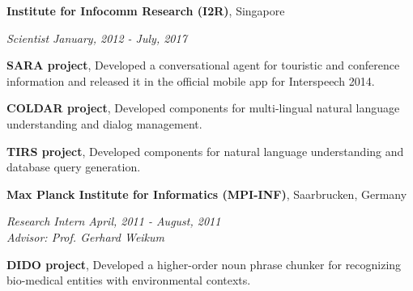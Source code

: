 \documentclass[margin,line]{res}
\newenvironment{list1}{
  \begin{list}{\ding{113}}{%
      \setlength{\itemsep}{0in}
      \setlength{\parsep}{0in} \setlength{\parskip}{0in}
      \setlength{\topsep}{0in} \setlength{\partopsep}{0in}
      \setlength{\leftmargin}{0.17in}}}{\end{list}}
\begin{document}
\begin{resume}
{\bf Institute for Infocomm Research (I2R)}, Singapore\\
\vspace{-.3cm}
\begin{list1}
\item[] {\em Scientist} \hfill {\em January, 2012 - July, 2017}\\
  \vspace{-.3cm}
  \begin{list1}
  \item[] {\bf SARA project}, Developed a conversational agent for touristic and conference information and released it in the official mobile app for Interspeech 2014.
  \item[] {\bf COLDAR project}, Developed components for multi-lingual natural language understanding and dialog management.
  \item[] {\bf TIRS project}, Developed components for natural language understanding and database query generation.
  \end{list1}
\end{list1}

{\bf Max Planck Institute for Informatics (MPI-INF)}, Saarbrucken, Germany\\
\vspace{-.3cm}
\begin{list1}
\item[] {\em Research Intern} \hfill {\em April, 2011 - August, 2011}\\
  {\em Advisor: Prof. Gerhard Weikum} \\
  \vspace{-.3cm}
  \begin{list1}
    \item[] {\bf DIDO project}, Developed a higher-order noun phrase chunker for recognizing bio-medical entities with environmental contexts.
  \end{list1}
\end{list1}


\end{resume}
\end{document}
